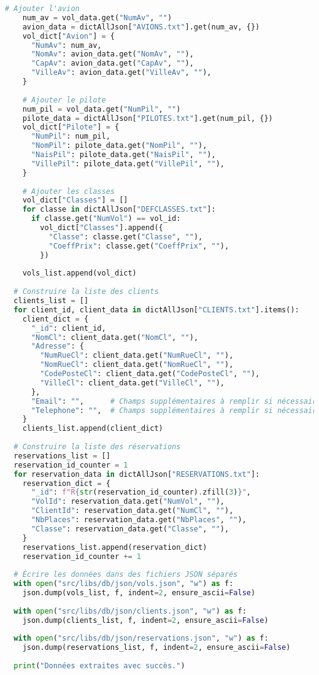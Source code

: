 \begin{lstlisting}[language=Python, caption=Script de création des documents JSON, label=lst:code_json]
    # Ajouter l'avion
    num_av = vol_data.get("NumAv", "")
    avion_data = dictAllJson["AVIONS.txt"].get(num_av, {})
    vol_dict["Avion"] = {
      "NumAv": num_av,
      "NomAv": avion_data.get("NomAv", ""),
      "CapAv": avion_data.get("CapAv", ""),
      "VilleAv": avion_data.get("VilleAv", ""),
    }
  
    # Ajouter le pilote
    num_pil = vol_data.get("NumPil", "")
    pilote_data = dictAllJson["PILOTES.txt"].get(num_pil, {})
    vol_dict["Pilote"] = {
      "NumPil": num_pil,
      "NomPil": pilote_data.get("NomPil", ""),
      "NaisPil": pilote_data.get("NaisPil", ""),
      "VillePil": pilote_data.get("VillePil", ""),
    }
  
    # Ajouter les classes
    vol_dict["Classes"] = []
    for classe in dictAllJson["DEFCLASSES.txt"]:
      if classe.get("NumVol") == vol_id:
        vol_dict["Classes"].append({
          "Classe": classe.get("Classe", ""),
          "CoeffPrix": classe.get("CoeffPrix", ""),
        })
  
    vols_list.append(vol_dict)
  
  # Construire la liste des clients
  clients_list = []
  for client_id, client_data in dictAllJson["CLIENTS.txt"].items():
    client_dict = {
      "_id": client_id,
      "NomCl": client_data.get("NomCl", ""),
      "Adresse": {
        "NumRueCl": client_data.get("NumRueCl", ""),
        "NomRueCl": client_data.get("NomRueCl", ""),
        "CodePosteCl": client_data.get("CodePosteCl", ""),
        "VilleCl": client_data.get("VilleCl", ""),
      },
      "Email": "",      # Champs supplémentaires à remplir si nécessaire
      "Telephone": "",  # Champs supplémentaires à remplir si nécessaire
    }
    clients_list.append(client_dict)
  
  # Construire la liste des réservations
  reservations_list = []
  reservation_id_counter = 1
  for reservation_data in dictAllJson["RESERVATIONS.txt"]:
    reservation_dict = {
      "_id": f"R{str(reservation_id_counter).zfill(3)}",
      "VolId": reservation_data.get("NumVol", ""),
      "ClientId": reservation_data.get("NumCl", ""),
      "NbPlaces": reservation_data.get("NbPlaces", ""),
      "Classe": reservation_data.get("Classe", ""),
    }
    reservations_list.append(reservation_dict)
    reservation_id_counter += 1
  
  # Écrire les données dans des fichiers JSON séparés
  with open("src/libs/db/json/vols.json", "w") as f:
    json.dump(vols_list, f, indent=2, ensure_ascii=False)
  
  with open("src/libs/db/json/clients.json", "w") as f:
    json.dump(clients_list, f, indent=2, ensure_ascii=False)
  
  with open("src/libs/db/json/reservations.json", "w") as f:
    json.dump(reservations_list, f, indent=2, ensure_ascii=False)
  
  print("Données extraites avec succès.")
\end{lstlisting}

